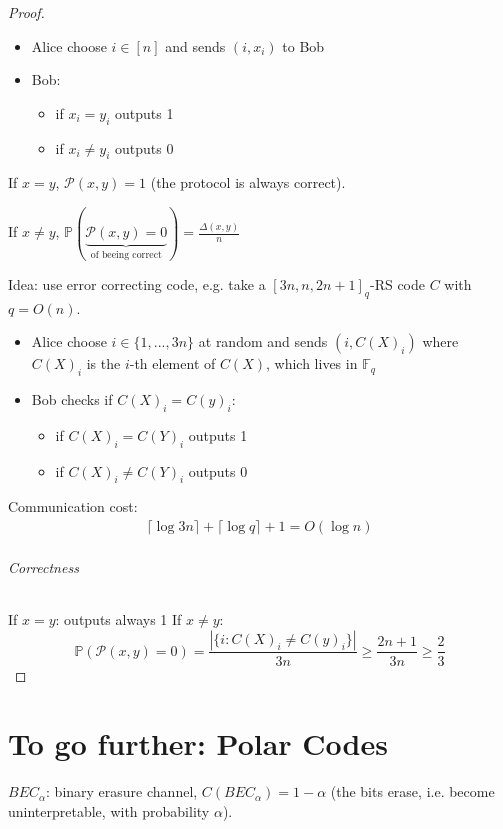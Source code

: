 \documentclass{article}
\begin{document}
\begin{proof}
\begin{itemize}
\item Alice choose $i\in [n]$ and sends $(i,x_i)$ to Bob
\item Bob:
\begin{itemize}
\item if $x_i=y_i$ outputs 1
\item if $x_i\neq y_i$ outputs 0
\end{itemize}
\end{itemize}

If $x=y$, $\mathcal{P}(x,y)=1$ (the protocol is always correct).

If $x\neq y$, $\mathbb{P}(\underbrace{\mathcal{P}(x,y)=0}_{\text{of beeing correct}})=\frac{\Delta(x,y)}{n}$

Idea: use error correcting code, e.g. take a $[3n,n,2n+1]_q$-RS code $C$ with $q=O(n)$.
\begin{itemize}
\item Alice choose $i\in \{1,...,3n\}$ at random and sends $(i,C(X)_i)$ where $C(X)_i$ is the $i$-th element of $C(X)$, which lives in $\mathbb{F}_q$
\item Bob checks if $C(X)_i=C(y)_i$:
\begin{itemize}
\item if $C(X)_i=C(Y)_i$ outputs 1
\item if $C(X)_i\neq C(Y)_i$ outputs 0
\end{itemize}
\end{itemize}

Communication cost:
\begin{align*}
\lceil \log 3n \rceil + \lceil \log q \rceil + 1 = O( \log n)
\end{align*}


\paragraph{Correctness} If $x=y$: outputs always 1
If $x\neq y$: 
\[\mathbb{P}(\mathcal{P}(x,y)=0)=\frac{|\{i: C(X)_i \neq C(y)_i\}|}{3n}\geq \frac{2n+1}{3n}\geq \frac{2}{3}\]
\end{proof}

\newpage
\part*{To go further: Polar Codes}
$BEC_\alpha$: binary erasure channel, $C(BEC_\alpha)=1-\alpha$ (the bits erase, i.e. become uninterpretable, with probability $\alpha$).
\end{document}
